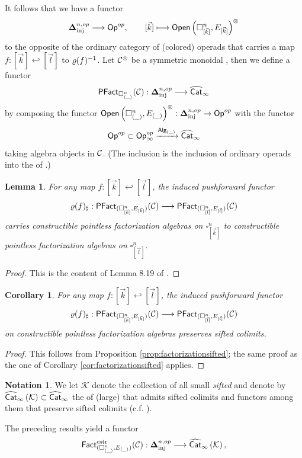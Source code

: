 \documentclass[10pt, reqno, twoside
, final
]{amsart}
\numberwithin{equation}{subsection}%
\theoremstyle{definition}
\theoremstyle{definition}
\theoremstyle{definition}
\newtheorem{nota}[defn]{Notation}
\theoremstyle{definition}
\theoremstyle{definition}
\theoremstyle{definition}
\theoremstyle{definition}
\theoremstyle{definition}
\theoremstyle{definition}
\theoremstyle{plain}
\theoremstyle{definition}
\theoremstyle{plain}
\theoremstyle{definition}
\theoremstyle{plain}
\newtheorem{cor}[defn]{Corollary}
\theoremstyle{definition}
\theoremstyle{definition}
\theoremstyle{plain}
\newtheorem{lem}[defn]{Lemma}
\theoremstyle{plain}
\theoremstyle{definition}
\theoremstyle{plain}
\theoremstyle{plain}
\theoremstyle{plain}
\begin{document}
It follows that we have a functor
\[   \boldsymbol{\Delta}^{n,op}_{\mathrm{inj}} \longrightarrow \mathsf{Op}^{op},\quad \quad [\vec{k}]\longmapsto \mathsf{Open}\left(\square^n_{[\vec{k}]},E_{[\vec{k}]}\right)^{\otimes} \]
to the opposite of the ordinary category of (colored) operads that carries a map $f:[\vec{k}]\hookleftarrow [\vec{l}]$ to $\varrho(f)^{-1}$. Let $\mathcal{C}^{\otimes}$ be a symmetric monoidal \infcatt, then we define a functor 
\[ \mathsf{PFact}_{\square^n_{(\_)}}(\mathcal{C}):\boldsymbol{\Delta}^{n,op}_{\mathrm{inj}}\longrightarrow \widehat{\mathsf{Cat}}_{\infty}\]
by composing the functor $\mathsf{Open}\left(\square^n_{(\_)},E_{(\_)}\right)^{\otimes}:\boldsymbol{\Delta}^{n,op}_{\mathrm{inj}}\rightarrow \mathsf{Op}^{op}$ with the functor
\[ \mathsf{Op}^{op}\subset \mathsf{Op}_{\infty}^{op}\xrightarrow{\mathsf{Alg}_{(\_)}}\widehat{\mathsf{Cat}}_{\infty} \]
taking algebra objects in $\mathcal{C}$. (The inclusion is the inclusion of ordinary operads into the \infcat of \infopst.)
\begin{lem}
For any map $f:[\vec{k}]\hookleftarrow [\vec{l}]$, the induced pushforward functor
\[ \varrho(f)_{\sharp}:\mathsf{PFact}_{(\square^n_{[\vec{k}]},E_{[\vec{k}]})}(\mathcal{C}) \longrightarrow  \mathsf{PFact}_{(\square^n_{[\vec{l}]},E_{[\vec{l}]})}(\mathcal{C})\]
carries constructible pointless factorization algebras on $\square^n_{[\vec{k}]}$ to constructible pointless factorization algebras on $\square^n_{[\vec{l}]}$.
\end{lem}
\begin{proof}
This is the content of Lemma 8.19 of \cite{KS}.
\end{proof}
\begin{cor}\label{cor:factorizationsifted2}
For any map $f:[\vec{k}]\hookleftarrow [\vec{l}]$, the induced pushforward functor
\[ \varrho(f)_{\sharp}:\mathsf{PFact}_{(\square^n_{[\vec{k}]},E_{[\vec{k}]})}(\mathcal{C}) \longrightarrow  \mathsf{PFact}_{(\square^n_{[\vec{l}]},E_{[\vec{l}]})}(\mathcal{C})\]
on constructible pointless factorization algebras preserves sifted colimits.
\end{cor}
\begin{proof}
This follows from Proposition \ref{prop:factorizationsifted}; the same proof as the one of Corollary \ref{cor:factorizationsifted} applies.    
\end{proof}
\begin{nota}
We let $\mathcal{K}$ denote the collection of all small \emph{sifted} \infcats and denote by $\widehat{\mathsf{Cat}}_{\infty}\left(\mathcal{K}\right)\subset \widehat{\mathsf{Cat}}_{\infty}$ the \infcat of (large) \infcats that admits sifted colimits and functors among them that preserve sifted colimits (c.f. \cite[Definition 4.8.1.1]{LurHA}).
\end{nota}
The preceding results yield a functor
\[ \mathsf{Fact}^{\mathrm{cstr}}_{(\square^n_{(\_)},E_{(\_)}) }(\mathcal{C}):\boldsymbol{\Delta}^{n,op}_{\mathrm{inj}}\longrightarrow \widehat{\mathsf{Cat}}_{\infty}\left(\mathcal{K}\right), \]
\end{document}
